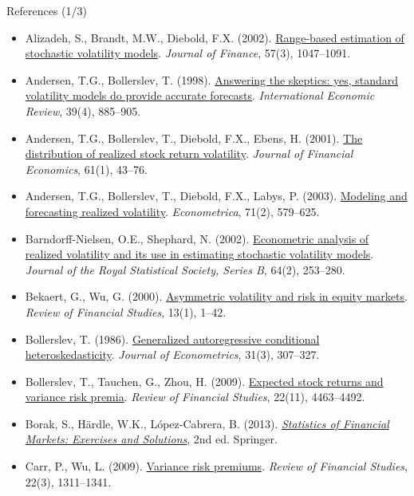 \begin{frame}{References (1/3)}
\itemsize{\tiny}
\begin{itemize}
    \item Alizadeh, S., Brandt, M.W., Diebold, F.X. (2002). \href{https://doi.org/10.1111/1540-6261.00454}{Range-based estimation of stochastic volatility models}. \textit{Journal of Finance}, 57(3), 1047--1091.
    \item Andersen, T.G., Bollerslev, T. (1998). \href{https://doi.org/10.2307/2527343}{Answering the skeptics: yes, standard volatility models do provide accurate forecasts}. \textit{International Economic Review}, 39(4), 885--905.
    \item Andersen, T.G., Bollerslev, T., Diebold, F.X., Ebens, H. (2001). \href{https://doi.org/10.1016/S0304-405X(01)00055-1}{The distribution of realized stock return volatility}. \textit{Journal of Financial Economics}, 61(1), 43--76.
    \item Andersen, T.G., Bollerslev, T., Diebold, F.X., Labys, P. (2003). \href{https://doi.org/10.1111/1468-0262.00418}{Modeling and forecasting realized volatility}. \textit{Econometrica}, 71(2), 579--625.
    \item Barndorff-Nielsen, O.E., Shephard, N. (2002). \href{https://doi.org/10.1111/1467-9868.00336}{Econometric analysis of realized volatility and its use in estimating stochastic volatility models}. \textit{Journal of the Royal Statistical Society, Series B}, 64(2), 253--280.
    \item Bekaert, G., Wu, G. (2000). \href{https://doi.org/10.1093/rfs/13.1.1}{Asymmetric volatility and risk in equity markets}. \textit{Review of Financial Studies}, 13(1), 1--42.
    \item Bollerslev, T. (1986). \href{https://doi.org/10.1016/0304-4076(86)90063-1}{Generalized autoregressive conditional heteroskedasticity}. \textit{Journal of Econometrics}, 31(3), 307--327.
    \item Bollerslev, T., Tauchen, G., Zhou, H. (2009). \href{https://doi.org/10.1093/rfs/hhp008}{Expected stock returns and variance risk premia}. \textit{Review of Financial Studies}, 22(11), 4463--4492.
    \item Borak, S., Härdle, W.K., López-Cabrera, B. (2013). \href{https://doi.org/10.1007/978-3-642-33929-5}{\textit{Statistics of Financial Markets: Exercises and Solutions}}, 2nd ed. Springer.
    \item Carr, P., Wu, L. (2009). \href{https://doi.org/10.1093/rfs/hhn038}{Variance risk premiums}. \textit{Review of Financial Studies}, 22(3), 1311--1341.

\end{itemize}
\end{frame}
